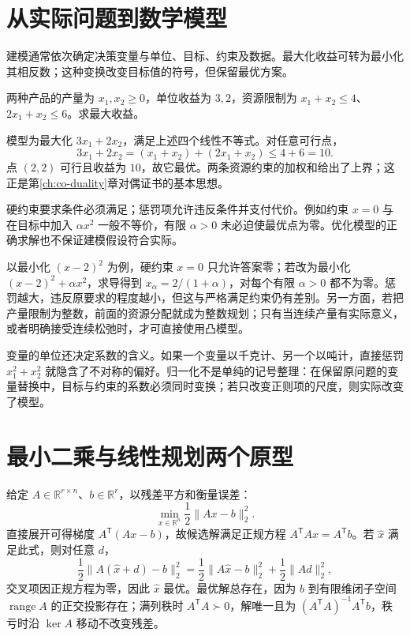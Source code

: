 \documentclass[UTF8,12pt,a4paper,fontset=fandol]{ctexbook}
\begin{document}
\section{从实际问题到数学模型}

建模通常依次确定决策变量与单位、目标、约束及数据。最大化收益可转为最小化其相反数；这种变换改变目标值的符号，但保留最优方案。

\begin{example}[资源分配]
两种产品的产量为 $x_1,x_2\geq0$，单位收益为 $3,2$，资源限制为 $x_1+x_2\leq4$、$2x_1+x_2\leq6$。求最大收益。
\end{example}
\begin{solve}
模型为最大化 $3x_1+2x_2$，满足上述四个线性不等式。对任意可行点，
\[
 3x_1+2x_2=(x_1+x_2)+(2x_1+x_2)\leq4+6=10.
\]
点 $(2,2)$ 可行且收益为 $10$，故它最优。两条资源约束的加权和给出了上界；这正是第\ref{ch:co-duality}章对偶证书的基本思想。
\end{solve}

硬约束要求条件必须满足；惩罚项允许违反条件并支付代价。例如约束 $x=0$ 与在目标中加入 $\alpha x^2$ 一般不等价，有限 $\alpha>0$ 未必迫使最优点为零。优化模型的正确求解也不保证建模假设符合实际。

以最小化 $(x-2)^2$ 为例，硬约束 $x=0$ 只允许答案零；若改为最小化 $(x-2)^2+\alpha x^2$，求导得到 $x_\alpha=2/(1+\alpha)$，对每个有限 $\alpha>0$ 都不为零。惩罚越大，违反原要求的程度越小，但这与严格满足约束仍有差别。另一方面，若把产量限制为整数，前面的资源分配就成为整数规划；只有当连续产量有实际意义，或者明确接受连续松弛时，才可直接使用凸模型。

变量的单位还决定系数的含义。如果一个变量以千克计、另一个以吨计，直接惩罚 $x_1^2+x_2^2$ 就隐含了不对称的偏好。归一化不是单纯的记号整理：在保留原问题的变量替换中，目标与约束的系数必须同时变换；若只改变正则项的尺度，则实际改变了模型。

\section{最小二乘与线性规划两个原型}

给定 $A\in\mathbb R^{r\times n}$、$b\in\mathbb R^r$，以残差平方和衡量误差：
\begin{equation}
 \min_{x\in\mathbb R^n}\frac12\|Ax-b\|_2^2.
 \label{eq:co-least-squares}
\end{equation}
直接展开可得梯度 $A^{\mathsf T}(Ax-b)$，故候选解满足正规方程 $A^{\mathsf T}Ax=A^{\mathsf T}b$。若 $\widehat x$ 满足此式，则对任意 $d$，
\[
 \frac12\|A(\widehat x+d)-b\|_2^2
 =\frac12\|A\widehat x-b\|_2^2+\frac12\|Ad\|_2^2,
\]
交叉项因正规方程为零，因此 $\widehat x$ 最优。最优解总存在，因为 $b$ 到有限维闭子空间 $\operatorname{range}A$ 的正交投影存在；满列秩时 $A^{\mathsf T}A\succ0$，解唯一且为 $(A^{\mathsf T}A)^{-1}A^{\mathsf T}b$，秩亏时沿 $\ker A$ 移动不改变残差。
\end{document}
